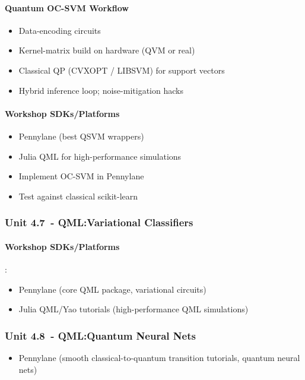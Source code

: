 \paragraph{Quantum OC-SVM Workflow}
\begin{itemize}
	\item Data-encoding circuits
	\item Kernel-matrix build on hardware (QVM or real)
	\item Classical QP (CVXOPT / LIBSVM) for support vectors
	\item Hybrid inference loop; noise-mitigation hacks
\end{itemize}


\paragraph{Workshop SDKs/Platforms}
\begin{itemize}
	\item Pennylane (best QSVM wrappers)
	\item Julia QML for high-performance simulations
	\item Implement OC-SVM in Pennylane
	\item Test against classical scikit-learn
\end{itemize}


\subsubsection*{Unit 4.7 - QML:Variational Classifiers}

\paragraph{Workshop SDKs/Platforms}:
\begin{itemize}
	\item Pennylane (core QML package, variational circuits)
	\item Julia QML/Yao tutorials (high-performance QML simulations)
\end{itemize}

\subsubsection*{Unit 4.8 - QML:Quantum Neural Nets}
\begin{itemize}
	\item Pennylane (smooth classical-to-quantum transition tutorials, quantum neural nets)
\end{itemize}


